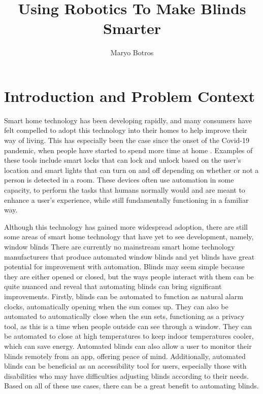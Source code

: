 \documentclass[10pt,twocolumn]{article}
\title{Using Robotics To Make Blinds Smarter}
\author{Maryo Botros}
\affiliation{Occidental College}
\begin{document}
\maketitle

\section{Introduction and Problem Context}

Smart home technology has been developing rapidly, and many consumers have felt compelled to adopt this technology into their homes to help improve their way of living. This has especially been the case since the onset of the Covid-19 pandemic, when people have started to spend more time at home \cite{Ghosh2021SmartHomeDevice}. Examples of these tools include smart locks that can lock and unlock based on the user's location and smart lights that can turn on and off depending on whether or not a person is detected in a room. These devices often use automation in some capacity, to perform the tasks that humans normally would and are meant to enhance a user’s experience, while still fundamentally functioning in a familiar way.

Although this technology has gained more widespread adoption, there are still some areas of smart home technology that have yet to see development, namely, window blinds There are currently no mainstream smart home technology manufacturers that produce automated window blinds and yet blinds have great potential for improvement with automation. Blinds may seem simple because they are either opened or closed, but the ways people interact with them can be quite nuanced and reveal that automating blinds can bring significant improvements. Firstly, blinds can be automated to function as natural alarm clocks, automatically opening when the sun comes up. They can also be automated to automatically close when the sun sets, functioning as a privacy tool, as this is a time when people outside can see through a window. They can be automated to close at high temperatures to keep indoor temperatures cooler, which can save energy. Automated blinds can also allow a user to monitor their blinds remotely from an app, offering peace of mind. Additionally, automated blinds can be beneficial as an accessibility tool for users, especially those with disabilities who may have difficulties adjusting blinds according to their needs. Based on all of these use cases, there can be a great benefit to automating blinds.
\end{document}
